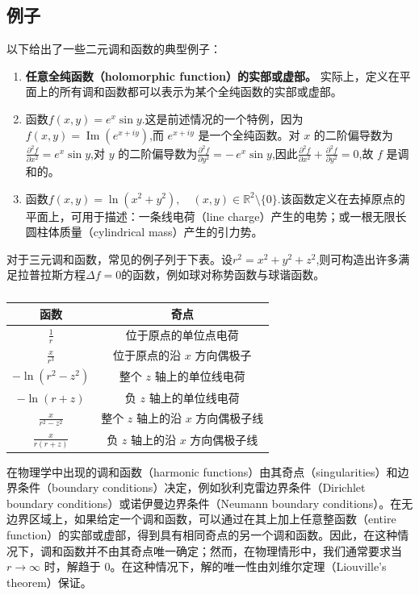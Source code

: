 \subsection{例子}
以下给出了一些二元调和函数的典型例子：
\begin{enumerate}
  \item \textbf{任意全纯函数（holomorphic function）的实部或虚部。}  
  实际上，定义在平面上的所有调和函数都可以表示为某个全纯函数的实部或虚部。
  \item 函数$f(x, y) = e^{x} \sin y$.这是前述情况的一个特例，因为$f(x, y) = \operatorname{Im}\!\left(e^{x + i y}\right)$,而 \( e^{x + i y} \) 是一个全纯函数。对 \(x\) 的二阶偏导数为$\frac{\partial^2 f}{\partial x^2} = e^{x} \sin y$,对 \(y\) 的二阶偏导数为$\frac{\partial^2 f}{\partial y^2} = -\, e^{x} \sin y$,因此$\frac{\partial^2 f}{\partial x^2} + \frac{\partial^2 f}{\partial y^2} = 0$,故 \(f\) 是调和的。
  \item 函数$f(x, y) = \ln\!\left(x^2 + y^2\right),\quad (x, y) \in \mathbb{R}^2 \setminus \{0\}$.该函数定义在去掉原点的平面上，可用于描述：一条线电荷（line charge）产生的电势；或一根无限长圆柱体质量（cylindrical mass）产生的引力势。
\end{enumerate}
对于三元调和函数，常见的例子列于下表。设$r^2 = x^2 + y^2 + z^2$,则可构造出许多满足拉普拉斯方程$\Delta f = 0$的函数，例如球对称势函数与球谐函数。
\begin{table}[ht]
\centering
\caption{}\label{tab_THhs1}
\begin{tabular}{|c|c|}
\hline
\textbf{函数}&\textbf{奇点}\\
\hline
\(\displaystyle \frac{1}{r}\)& 位于原点的单位点电荷 \\
\hline
\(\displaystyle \frac{x}{r^{3}}\)& 位于原点的沿 \(x\) 方向偶极子 \\
\hline
\(\displaystyle -\ln\!\left(r^{2}-z^{2}\right)\) & 整个 \(z\) 轴上的单位线电荷 \\
\hline
\(\displaystyle -\ln(r+z)\) & 负 \(z\) 轴上的单位线电荷 \\
\hline
\(\displaystyle \frac{x}{r^{2}-z^{2}}\) & 整个 \(z\) 轴上的沿 \(x\) 方向偶极子线 \\
\hline
\(\displaystyle \frac{x}{r(r+z)}\) & 负 \(z\) 轴上的沿 \(x\) 方向偶极子线 \\
\hline
\end{tabular}
\end{table}
在物理学中出现的调和函数（harmonic functions）由其奇点（singularities）和边界条件（boundary conditions）决定，例如狄利克雷边界条件（Dirichlet boundary conditions）或诺伊曼边界条件（Neumann boundary conditions）。在无边界区域上，如果给定一个调和函数，可以通过在其上加上任意整函数（entire function）的实部或虚部，得到具有相同奇点的另一个调和函数。因此，在这种情况下，调和函数并不由其奇点唯一确定；然而，在物理情形中，我们通常要求当\( r \to \infty \) 时，解趋于 \(0\)。在这种情况下，解的唯一性由刘维尔定理（Liouville's theorem）保证。

